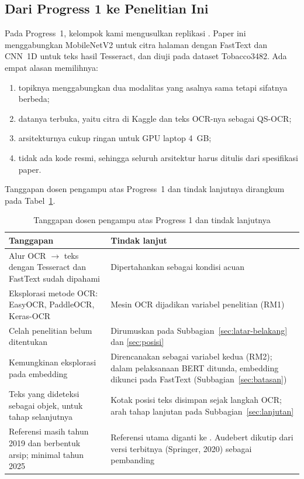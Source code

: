 \subsection{Dari Progress 1 ke Penelitian Ini}\label{sec:riwayat}

Pada Progress~1, kelompok kami mengusulkan replikasi \textcite{audebert2020}. Paper ini
menggabungkan MobileNetV2 untuk citra halaman dengan FastText dan CNN~1D untuk teks hasil
Tesseract, dan diuji pada dataset Tobacco3482. Ada empat alasan memilihnya:
\begin{enumerate}
  \item topiknya menggabungkan dua modalitas yang asalnya sama tetapi sifatnya berbeda;
  \item datanya terbuka, yaitu citra di Kaggle dan teks OCR-nya sebagai QS-OCR;
  \item arsitekturnya cukup ringan untuk GPU laptop 4~GB;
  \item tidak ada kode resmi, sehingga seluruh arsitektur harus ditulis dari spesifikasi
  paper.
\end{enumerate}

Tanggapan dosen pengampu atas Progress~1 dan tindak lanjutnya dirangkum pada
Tabel~\ref{tab:tanggapan}.

\begin{table}[H]
  \centering
  \caption{Tanggapan dosen pengampu atas Progress 1 dan tindak lanjutnya}
  \label{tab:tanggapan}
  \fontsize{10}{12}\selectfont
  \begin{tabularx}{\textwidth}{|>{\raggedright\arraybackslash}p{5.2cm}|>{\raggedright\arraybackslash}X|}
    \hline
    \textbf{Tanggapan} & \textbf{Tindak lanjut} \\ \hline
    Alur OCR $\rightarrow$ teks dengan Tesseract dan FastText sudah dipahami &
    Dipertahankan sebagai kondisi acuan \\ \hline
    Eksplorasi metode OCR: EasyOCR, PaddleOCR, Keras-OCR &
    Mesin OCR dijadikan variabel penelitian (RM1) \\ \hline
    Celah penelitian belum ditentukan &
    Dirumuskan pada Subbagian~\ref{sec:latar-belakang} dan \ref{sec:posisi} \\ \hline
    Kemungkinan eksplorasi pada embedding &
    Direncanakan sebagai variabel kedua (RM2); dalam pelaksanaan BERT ditunda, embedding
    dikunci pada FastText (Subbagian~\ref{sec:batasan}) \\ \hline
    Teks yang dideteksi sebagai objek, untuk tahap selanjutnya &
    Kotak posisi teks disimpan sejak langkah OCR; arah tahap lanjutan pada
    Subbagian~\ref{sec:lanjutan} \\ \hline
    Referensi masih tahun 2019 dan berbentuk arsip; minimal tahun 2025 &
    Referensi utama diganti ke \textcite{kashyap2026}. Audebert dikutip dari versi
    terbitnya (Springer, 2020) sebagai pembanding \\ \hline
  \end{tabularx}
\end{table}

